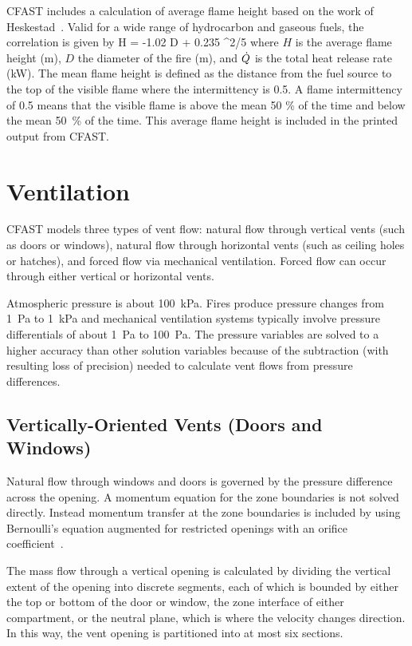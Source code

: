 CFAST includes a calculation of average flame height based on the work of Heskestad~\cite{Heskestad:2002}. Valid for a wide range of hydrocarbon and gaseous fuels, the correlation is given by
\be
   H = -1.02 D + 0.235 ^{2/5}
\ee
where $H$ is the average flame height (m), $D$ the diameter of the fire (m), and $\dot{Q}$ is the total heat release rate (kW). The mean flame height is defined as the distance from the fuel source to the top of the visible flame where the intermittency is 0.5.  A flame intermittency of 0.5 means that the visible flame is above the mean 50 \% of the time and below the mean 50~\% of the time.  This average flame height is  included in the printed output from CFAST.







\chapter{Ventilation}

CFAST models three types of vent flow: natural flow through vertical vents (such as doors or windows),  natural flow through horizontal vents (such as ceiling holes or hatches), and forced flow via mechanical ventilation. Forced flow can occur through either vertical or horizontal vents.

Atmospheric pressure is about 100~kPa. Fires produce pressure changes from 1~Pa to 1~kPa and mechanical ventilation systems typically involve pressure differentials of about 1~Pa to 100~Pa.  The pressure variables are solved to a higher accuracy than other solution variables because of the subtraction (with resulting loss of precision) needed to calculate vent flows from pressure differences.


\section{Vertically-Oriented Vents (Doors and Windows)}

Natural flow through windows and doors is governed by the pressure difference across the opening.  A momentum equation for the zone boundaries is not solved directly.  Instead momentum transfer at the zone boundaries is included by using Bernoulli's equation augmented for restricted openings with an orifice coefficient~\cite{Quintiere:1984, Steckler_Coefficients}.

The mass flow through a vertical opening is calculated by dividing the vertical extent of the opening into discrete segments, each of which is bounded by either the top or bottom of the door or window, the zone interface of either compartment, or the neutral plane, which is where the velocity changes direction. In this way, the vent opening is partitioned into at most six sections.

